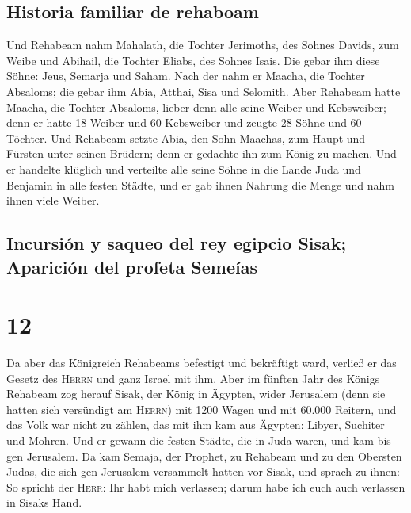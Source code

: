 \hypertarget{historia-familiar-de-rehaboam}{%
\subsection{Historia familiar de
rehaboam}\label{historia-familiar-de-rehaboam}}

 Und Rehabeam nahm Mahalath, die Tochter Jerimoths, des
Sohnes Davids, zum Weibe und Abihail, die Tochter Eliabs, des Sohnes
Isais.  Die gebar ihm diese Söhne: Jeus, Semarja und
Saham.  Nach der nahm er Maacha, die Tochter Absaloms;
die gebar ihm Abia, Atthai, Sisa und Selomith.  Aber
Rehabeam hatte Maacha, die Tochter Absaloms, lieber denn alle seine
Weiber und Kebsweiber; denn er hatte 18 Weiber und 60 Kebsweiber und
zeugte 28 Söhne und 60 Töchter.  Und Rehabeam setzte
Abia, den Sohn Maachas, zum Haupt und Fürsten unter seinen Brüdern; denn
er gedachte ihn zum König zu machen.  Und er handelte
klüglich und verteilte alle seine Söhne in die Lande Juda und Benjamin
in alle festen Städte, und er gab ihnen Nahrung die Menge und nahm ihnen
viele Weiber.

\hypertarget{incursiuxf3n-y-saqueo-del-rey-egipcio-sisak-apariciuxf3n-del-profeta-semeuxedas}{%
\subsection{Incursión y saqueo del rey egipcio Sisak; Aparición del
profeta
Semeías}\label{incursiuxf3n-y-saqueo-del-rey-egipcio-sisak-apariciuxf3n-del-profeta-semeuxedas}}

\hypertarget{section-11}{%
\section{12}\label{section-11}}

 Da aber das Königreich Rehabeams befestigt und bekräftigt
ward, verließ er das Gesetz des \textsc{Herrn} und ganz Israel mit ihm.
 Aber im fünften Jahr des Königs Rehabeam zog herauf
Sisak, der König in Ägypten, wider Jerusalem (denn sie hatten sich
versündigt am \textsc{Herrn})  mit 1200 Wagen und mit
60.000 Reitern, und das Volk war nicht zu zählen, das mit ihm kam aus
Ägypten: Libyer, Suchiter und Mohren.  Und er gewann die
festen Städte, die in Juda waren, und kam bis gen Jerusalem.
 Da kam Semaja, der Prophet, zu Rehabeam und zu den
Obersten Judas, die sich gen Jerusalem versammelt hatten vor Sisak, und
sprach zu ihnen: So spricht der \textsc{Herr}: Ihr habt mich verlassen;
darum habe ich euch auch verlassen in Sisaks Hand.

